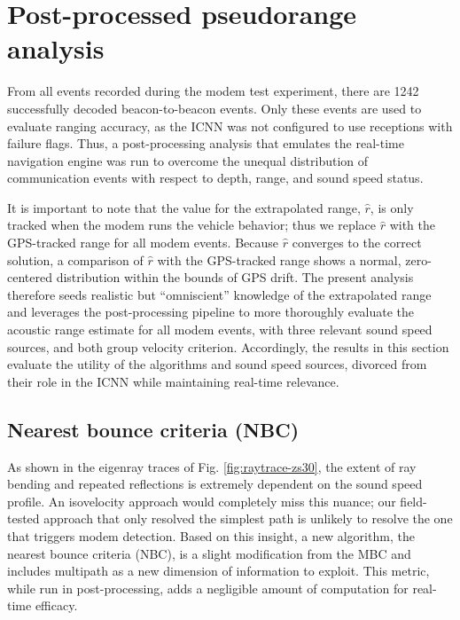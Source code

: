 \clearpage
\section{\label{sec:post} Post-processed pseudorange analysis}

From all events recorded during the modem test experiment, there are 1242 successfully decoded beacon-to-beacon events.
Only these events are used to evaluate ranging accuracy, as the ICNN was not configured to use receptions with failure flags.
Thus, a post-processing analysis that emulates the real-time navigation engine was run to overcome the unequal distribution of communication events with respect to depth, range, and sound speed status.

It is important to note that the value for the extrapolated range, $\hat{r}$, is only tracked when the modem runs the vehicle behavior; thus we replace $\hat{r}$ with the GPS-tracked range for all modem events.
Because $\hat{r}$ converges to the correct solution, a comparison of $\hat{r}$ with the GPS-tracked range shows a normal, zero-centered distribution within the bounds of GPS drift.
The present analysis therefore seeds realistic but ``omniscient'' knowledge of the extrapolated range and leverages the post-processing pipeline to more thoroughly evaluate the acoustic range estimate for all modem events, with three relevant sound speed sources, and both group velocity criterion.
Accordingly, the results in this section evaluate the utility of the algorithms and sound speed sources, divorced from their role in the ICNN while maintaining real-time relevance.

\subsection{Nearest bounce criteria (NBC)}

 As shown in the eigenray traces of Fig. \ref{fig:raytrace-zs30}, the extent of ray bending and repeated reflections is extremely dependent on the sound speed profile.
An isovelocity approach would completely miss this nuance; our field-tested approach that only resolved the simplest path is unlikely to resolve the one that triggers modem detection.
Based on this insight, a new algorithm, the nearest bounce criteria (NBC), is a slight modification from the MBC and includes multipath as a new dimension of information to exploit.
This metric, while run in post-processing, adds a negligible amount of computation for real-time efficacy.

